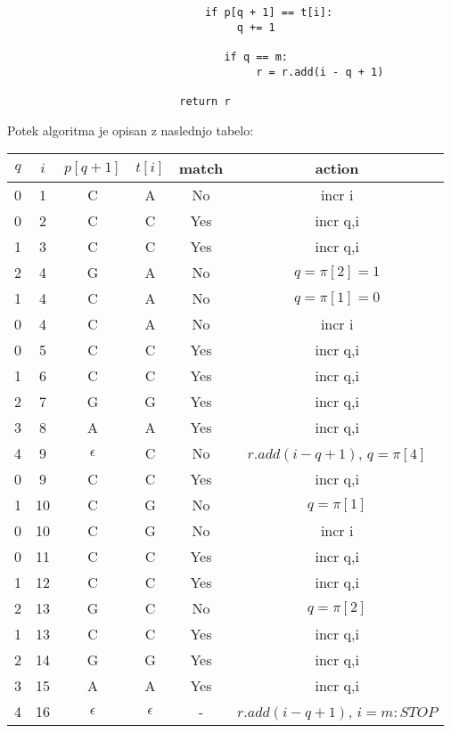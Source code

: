 \documentclass{article}
\begin{document}
\begin{enumerate}
\begin{enumerate}
\begin{verbatim}
							   if p[q + 1] == t[i]:
									q += 1

								  if q == m:
									   r = r.add(i - q + 1)

						   return r
				\end{verbatim}

				Potek algoritma je opisan z naslednjo tabelo:

				\begin{tabular}{|c|c|c|c|c|c|}
					\hline
					$q$ & $i$ & $p[q+1]$ & $t[i]$ & match & action \\
					\hline\hline
					0 & 1 & C & A & No & incr i \\
					\hline
					0 & 2 & C & C & Yes & incr q,i \\
					\hline
					1 & 3 & C & C & Yes & incr q,i \\
					\hline
					2 & 4 & G & A & No & $q=\pi[2]=1$ \\
					\hline
					1 & 4 & C & A & No & $q=\pi[1]=0$ \\
					\hline
					0 & 4 & C & A & No & incr i \\
					\hline
					0 & 5 & C & C & Yes & incr q,i \\
					\hline
					1 & 6 & C & C & Yes & incr q,i \\
					\hline
					2 & 7 & G & G & Yes & incr q,i \\
					\hline
					3 & 8 & A & A & Yes & incr q,i \\
					\hline
					4 & 9 & $\epsilon$ & C & No & $r.add(i-q+1)$, $q=\pi[4]$ \\
					\hline
					0 & 9 & C & C & Yes & incr q,i \\
					\hline
					1 & 10 & C & G & No & $q=\pi[1]$ \\
					\hline
					0 & 10 & C & G & No & incr i \\
					\hline
					0 & 11 & C & C & Yes & incr q,i \\
					\hline
					1 & 12 & C & C & Yes & incr q,i \\
					\hline
					2 & 13 & G & C & No & $q=\pi[2]$ \\
					\hline
					1 & 13 & C & C & Yes & incr q,i \\
					\hline
					2 & 14 & G & G & Yes & incr q,i \\
					\hline
					3 & 15 & A & A & Yes & incr q,i \\
					\hline
					4 & 16 & $\epsilon$ & $\epsilon$ & - & $r.add(i-q+1)$, $i=m:STOP$ \\
					\hline
				\end{tabular}


\end{enumerate}
\end{enumerate}
\end{document}
